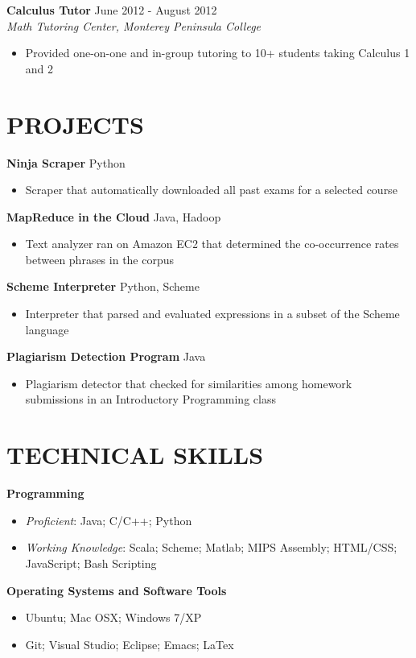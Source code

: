 \documentclass[margin]{res}
\begin{document}
\begin{resume}
\textbf{Calculus Tutor} \hfill June 2012 - August 2012 \\
\textit{Math Tutoring Center, Monterey Peninsula College} \smallskip
\begin{itemize}[leftmargin=10pt]
\item Provided one-on-one and in-group tutoring to 10+ students taking Calculus 1 and 2
\end{itemize}

\section{PROJECTS} 
\textbf{Ninja Scraper} \hfill Python
\begin{itemize}[leftmargin=10pt]
\itemsep -2pt %
\item Scraper that automatically downloaded all past exams for a selected course
\end{itemize}
            
\textbf{MapReduce in the Cloud} \hfill Java, Hadoop
\begin{itemize}[leftmargin=10pt]
\itemsep -2pt %
\item Text analyzer ran on Amazon EC2 that determined
the co-occurrence rates between phrases in the corpus
\end{itemize}

\textbf{Scheme Interpreter} \hfill Python, Scheme
\begin{itemize}[leftmargin=10pt]
\itemsep -2pt %
\item Interpreter that parsed and evaluated expressions in a subset of the Scheme language
\end{itemize}

\textbf{Plagiarism Detection Program} \hfill Java
\begin{itemize}[leftmargin=10pt]
\itemsep -2pt %
\item Plagiarism detector that checked for similarities among
homework submissions in an Introductory Programming class
\end{itemize}

\section{TECHNICAL SKILLS}
\textbf{Programming}
\begin{itemize}[leftmargin=10pt]
\item \textit{Proficient}: Java; C/C++; Python
\item \textit{Working Knowledge}: Scala; Scheme; Matlab; MIPS Assembly; HTML/CSS; JavaScript; Bash Scripting
\end{itemize}

\textbf{Operating Systems and Software Tools}
\begin{itemize}[leftmargin=10pt]
\item Ubuntu; Mac OSX; Windows 7/XP
\item Git; Visual Studio; Eclipse; Emacs; LaTex
\end{itemize}

\end{resume}
\end{document}
